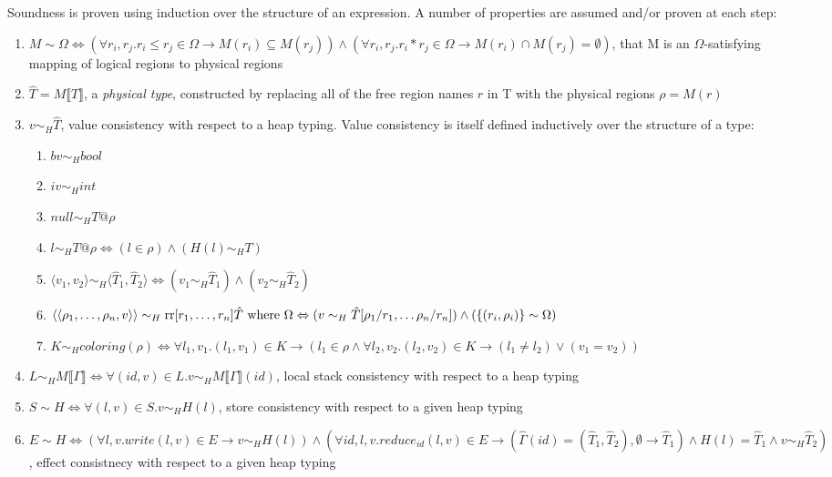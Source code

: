 Soundness is proven using induction over the structure of an expression.  A number of properties
are assumed and/or proven at each step: 
\begin{enumerate}
\item $M \sim \Omega \Leftrightarrow (\forall r_i, r_j. r_i \leq r_j \in \Omega \rightarrow M(r_i) \subseteq M(r_j)) \wedge (\forall r_i, r_j. r_i * r_j \in \Omega \rightarrow M(r_i) \cap M(r_j) = \emptyset)$, that M is an $\Omega$-satisfying mapping of logical regions to physical regions
\item $\hat T = M \llbracket T \rrbracket$, a {\em physical type}, constructed by replacing all of the free region names $r$ in T with the physical regions $\rho = M(r)$
\item $v \sim_H \hat T$, value consistency with respect to a heap typing.  Value consistency is
itself defined inductively over the structure of a type:
\begin{enumerate}
\item $bv \sim_H bool$
\item $iv \sim_H int$
\item $null \sim_H T@\rho$
\item $l \sim_H T@\rho \Leftrightarrow (l \in \rho) \wedge (H(l) \sim_H T)$
\item $\langle v_1, v_2 \rangle \sim_H \langle \hat T_1, \hat T_2 \rangle \Leftrightarrow (v_1 \sim_H \hat T_1) \wedge (v_2 \sim_H \hat T_2)$
\item $\langle \langle {\rho}_1,\ldots,{\rho}_n, v \rangle \rangle \sim_H \text{rr}[{r}_1,\ldots,{r}_n] \hat T\text{ where }\Omega \Leftrightarrow (v \sim_H \hat T[\rho_1/r_1, \ldots \rho_n/r_n]) \wedge (\{ (r_i, \rho_i) \} \sim \Omega)$
\item $K \sim_H coloring(\rho) \Leftrightarrow \forall l_1, v_1. (l_1, v_1) \in K \rightarrow (l_1 \in \rho \wedge \forall l_2, v_2. (l_2, v_2) \in K \rightarrow (l_1 \not= l_2) \vee (v_1 = v_2))$
\end{enumerate}
\item $L \sim_H M \llbracket \Gamma \rrbracket \Leftrightarrow \forall (id,v) \in L. v \sim_H M \llbracket \Gamma \rrbracket (id) $, local stack consistency with respect to a heap typing
\item $S \sim H \Leftrightarrow \forall (l,v) \in S. v \sim_H H(l)$, store consistency with respect to a given heap typing
\item $E \sim H \Leftrightarrow (\forall l, v. write(l,v) \in E \rightarrow v \sim_H H(l)) \wedge (\forall id, l, v. reduce_{id}(l, v) \in E \rightarrow (\hat \Gamma (id) = (\hat T_1, \hat T_2), \emptyset \rightarrow \hat T_1) \wedge H(l) = \hat T_1 \wedge v \sim_H \hat T_2)$, effect consistnecy with respect to a given heap typing
\end{enumerate}

